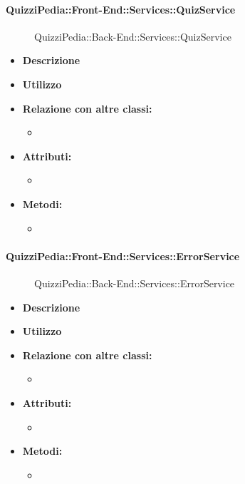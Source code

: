 \paragraph{QuizziPedia::Front-End::Services::QuizService}
\begin{figure}
	\centering
	\caption{QuizziPedia::Back-End::Services::QuizService}
\end{figure}
\begin{itemize}
	\item \textbf{Descrizione} \\ 
	\item \textbf{Utilizzo} \\
	\item \textbf{Relazione con altre classi:}
	\begin{itemize}
		\item 
	\end{itemize}
	\item \textbf{Attributi:}
	\begin{itemize}
		\item 
	\end{itemize}
	\item \textbf{Metodi:}
	\begin{itemize}
		\item 
	\end{itemize}
\end{itemize}

\paragraph{QuizziPedia::Front-End::Services::ErrorService}
\begin{figure}
	\centering
	\caption{QuizziPedia::Back-End::Services::ErrorService}
\end{figure}
\begin{itemize}
	\item \textbf{Descrizione} \\ 
	\item \textbf{Utilizzo} \\
	\item \textbf{Relazione con altre classi:}
	\begin{itemize}
		\item 
	\end{itemize}
	\item \textbf{Attributi:}
	\begin{itemize}
		\item 
	\end{itemize}
	\item \textbf{Metodi:}
	\begin{itemize}
		\item 
	\end{itemize}
\end{itemize}

